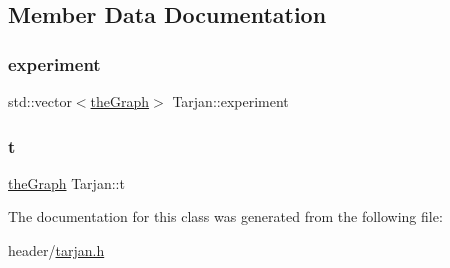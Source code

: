 \subsection{Member Data Documentation}
\mbox{\label{class_tarjan_aaa327f105a07f07648dcc6f62a565986}} 
\subsubsection{\texorpdfstring{experiment}{experiment}}
{\footnotesize\ttfamily std\+::vector$<$\hyperlink{class_graph_component_a982e0748a6e1b8dc74986f5f8b3dca5c}{the\+Graph}$>$ Tarjan\+::experiment}

\mbox{\label{class_tarjan_a54b0703f885a3514ea0bf4cdbc7fdaad}} 
\subsubsection{\texorpdfstring{t}{t}}
{\footnotesize\ttfamily \hyperlink{class_graph_component_a982e0748a6e1b8dc74986f5f8b3dca5c}{the\+Graph} Tarjan\+::t}



The documentation for this class was generated from the following file\+:\begin{DoxyCompactItemize}
\item 
header/\hyperlink{tarjan_8h}{tarjan.\+h}\end{DoxyCompactItemize}

